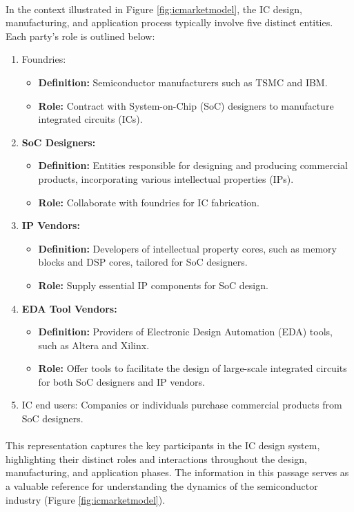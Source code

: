 \paragraph*{}
In the context illustrated in Figure \ref{fig:icmarketmodel}, the IC design, manufacturing, and application process typically involve five distinct entities. Each party's role is outlined below:
\begin{enumerate}
	\item Foundries: \begin{itemize}
		\item \textbf{Definition:} Semiconductor manufacturers such as TSMC and IBM.
		\item \textbf{Role:} Contract with System-on-Chip (SoC) designers to manufacture integrated circuits (ICs).
	\end{itemize}
	\item \textbf{SoC Designers:} \begin{itemize}
		\item \textbf{Definition:} Entities responsible for designing and producing commercial products, incorporating various intellectual properties (IPs).
		\item \textbf{Role:} Collaborate with foundries for IC fabrication.
	\end{itemize}
	\item \textbf{IP Vendors:} \begin{itemize}
		\item \textbf{Definition:} Developers of intellectual property cores, such as memory blocks and DSP cores, tailored for SoC designers.
		\item \textbf{Role:} Supply essential IP components for SoC design.
	\end{itemize}
	\item \textbf{EDA Tool Vendors:} \begin{itemize}
		\item\textbf{ Definition:} Providers of Electronic Design Automation (EDA) tools, such as Altera and Xilinx.
		\item \textbf{Role:} Offer tools to facilitate the design of large-scale integrated circuits for both SoC designers and IP vendors.
	\end{itemize}
	\item IC end users:
	Companies or individuals purchase commercial products from SoC designers.
\end{enumerate}
\paragraph*{}
This representation captures the key participants in the IC design system, highlighting their distinct roles and interactions throughout the design, manufacturing, and application phases. The information in this passage serves as a valuable reference for understanding the dynamics of the semiconductor industry (Figure \ref{fig:icmarketmodel}).


